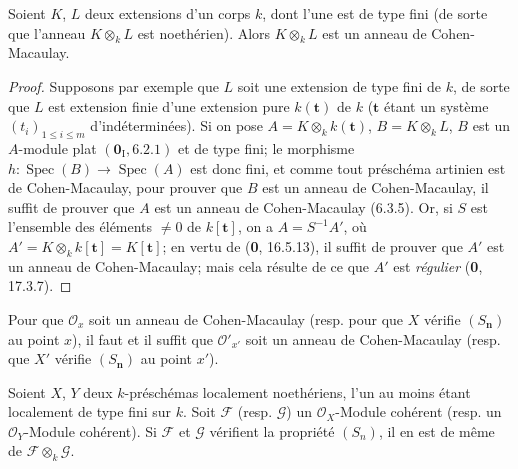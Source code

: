 \begin{lemma}[6.7.1.1]
\label{IV.2.s6.7.1.1-fr}
Soient $K$, $L$ deux extensions d'un corps $k$, dont l'une est de type
fini (de sorte que l'anneau $K\otimes_k L$ est noethérien). Alors
$K\otimes_k L$ est un anneau de Cohen-Macaulay.
\end{lemma}

\begin{proof}
Supposons par exemple que $L$ soit une extension de type fini de $k$,
de sorte que $L$ est extension finie d'une extension pure $k(\mathbf t)$
de $k$ ($\mathbf t$ étant un système $(t_i)_{1\leqslant i\leqslant m}$
d'indéterminées). Si on pose $A=K\otimes_k k(\mathbf t)$,
$B=K\otimes_k L$, $B$ est un $A$-module plat $(\mathbf{0}_{\mathrm I},6.2.1)$ et de type fini;
le morphisme $h:\operatorname{Spec}(B)\to\operatorname{Spec}(A)$ est
donc fini, et comme tout préschéma artinien est de Cohen-Macaulay, pour
prouver que $B$ est un anneau de Cohen-Macaulay, il suffit de prouver que
$A$ est un anneau de Cohen-Macaulay (6.3.5). Or, si $S$ est l'ensemble
des éléments $\neq 0$ de $k[\mathbf t]$, on a $A=S^{-1}A'$, où
$A'=K\otimes_k k[\mathbf t]=K[\mathbf t]$; en vertu de
(\textbf{0}, 16.5.13), il suffit de prouver que $A'$ est un anneau de
Cohen-Macaulay; mais cela résulte de ce que $A'$ est \emph{régulier} (\textbf{0}, 17.3.7).
\end{proof}

\begin{corollary}[6.7.2]
Pour que $\mathcal O_x$ soit un anneau de Cohen-Macaulay \textup{(resp.} pour
que $X$ vérifie $(S_{\boldsymbol{n}})$ au point $x$), il faut et il suffit
que $\mathcal O'_{x'}$ soit un anneau de Cohen-Macaulay \textup{(resp.} que $X'$
vérifie $(S_{\boldsymbol{n}})$ au point $x'$).
\end{corollary}

\begin{corollary}[6.7.3]
\label{IV.2.s6.7.3-fr}
Soient $X$, $Y$ deux $k$-préschémas localement noethériens, l'un au
moins étant localement de type fini sur $k$. Soit $\mathscr F$ \textup{(resp.}
$\mathscr G$) un $\mathcal O_X$-Module cohérent \textup{(resp.} un
$\mathcal O_Y$-Module cohérent). Si $\mathscr F$ et $\mathscr G$
vérifient la propriété $(S_n)$, il en est de même de
$\mathscr F\otimes_k\mathscr G$.
\end{corollary}

